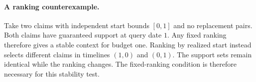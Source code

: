 \paragraph{A ranking counterexample.}
Take two claims with independent start bounds $[0,1]$ and no replacement pairs.
Both claims have guaranteed support at query date $1$.
Any fixed ranking therefore gives a stable context for budget one.
Ranking by realized start instead selects different claims in timelines $(1,0)$ and $(0,1)$.
The support sets remain identical while the ranking changes.
The fixed-ranking condition is therefore necessary for this stability test.
